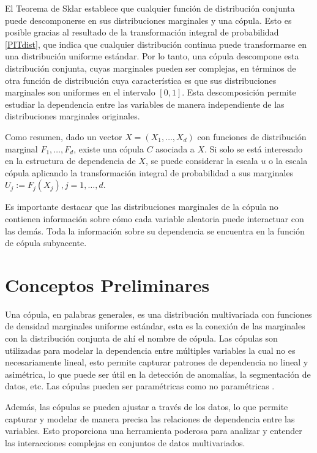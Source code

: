 El Teorema de Sklar establece que cualquier función de distribución conjunta puede descomponerse en sus distribuciones marginales y una cópula. Esto es posible gracias al resultado de la transformación integral de probabilidad \eqref{PITdist}, que indica que cualquier distribución continua puede transformarse en una distribución uniforme estándar. Por lo tanto, una cópula descompone esta distribución conjunta, cuyas marginales pueden ser complejas, en términos de otra función de distribución cuya característica es que sus distribuciones marginales son uniformes en el intervalo $[0,1]$. Esta descomposición permite estudiar la dependencia entre las variables de manera independiente de las distribuciones marginales originales.

Como resumen, dado un vector $X = (X_1, \dots, X_d)$ con funciones de distribución marginal $F_1, \dots, F_d$, existe una cópula $C$ asociada a $X$. Si solo se está interesado en la estructura de dependencia de $X$, se puede considerar la escala $u$ o la escala cópula aplicando la transformación integral de probabilidad a sus marginales $U_j := F_j(X_j), j = 1, \dots, d$.

Es importante destacar que las distribuciones marginales de la cópula no contienen información sobre cómo cada variable aleatoria puede interactuar con las demás. Toda la información sobre su dependencia se encuentra en la función de cópula subyacente.

\section{Conceptos Preliminares}

Una cópula, en palabras generales, es una distribución multivariada con funciones de densidad marginales uniforme estándar, esta es la conexión de las marginales con la distribución conjunta de ahí el nombre de cópula. Las cópulas son utilizadas para modelar la dependencia entre múltiples variables la cual no es necesariamente lineal, esto permite capturar patrones de dependencia no lineal y asimétrica, lo que puede ser útil en la detección de anomalías, la segmentación de datos, etc. Las cópulas pueden ser paramétricas como no paramétricas \cite{CopulasR}.

Además, las cópulas se pueden ajustar a través de los datos, lo que permite capturar y modelar de manera precisa las relaciones de dependencia entre las variables. Esto proporciona una herramienta poderosa para analizar y entender las interacciones complejas en conjuntos de datos multivariados.

